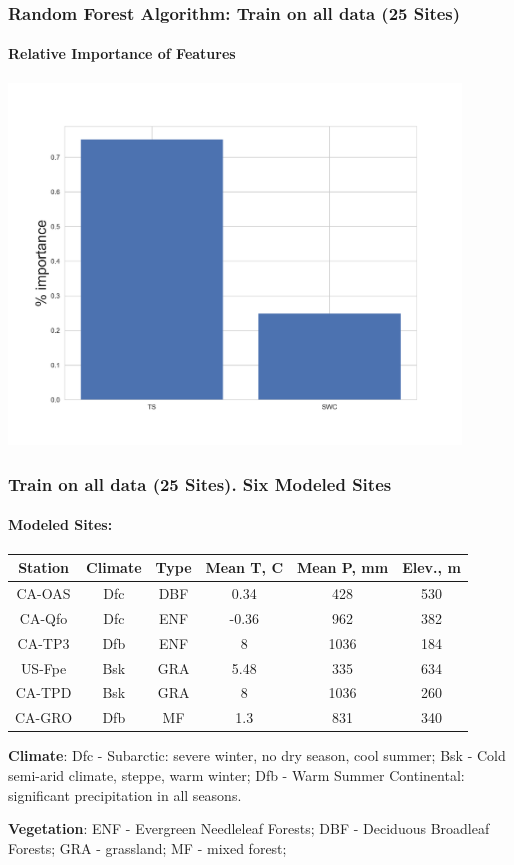\documentclass{beamer}
\begin{document}
\begin{frame}
\frametitle{Random Forest Algorithm: Train on all data (25 Sites)}
\framesubtitle{Relative Importance of Features}
\centering
\includegraphics[width=0.9\textwidth]{importance_3.png}\\
\end{frame}

\begin{frame}
\frametitle{Train on all data (25 Sites). Six Modeled Sites}
\framesubtitle{Modeled Sites:}
\begin{center}
\begin{tabular}{| c | c | c | c | c | c |}
\hline
Station   & Climate & Type & Mean T, C & Mean P, mm & Elev., m\\ \hline
CA-OAS & Dfc     & DBF  & 0.34      & 428        & 530 \\\hline
CA-Qfo & Dfc     & ENF  & -0.36     & 962        & 382 \\\hline
CA-TP3 & Dfb     & ENF  & 8         & 1036       & 184 \\\hline
US-Fpe & Bsk     & GRA  & 5.48      & 335        & 634 \\\hline
CA-TPD & Bsk     & GRA  & 8         & 1036       & 260 \\\hline
CA-GRO & Dfb     & MF   & 1.3         & 831       & 340 \\\hline

\hline
\end{tabular}
\end{center}
\textbf{Climate}:
Dfc - Subarctic: severe winter, no dry season, cool summer;
Bsk - Cold semi-arid climate, steppe, warm winter;
Dfb - Warm Summer Continental: significant precipitation in all seasons.

\textbf{Vegetation}:
ENF - Evergreen Needleleaf Forests;
DBF - Deciduous Broadleaf Forests;
GRA - grassland;
MF - mixed forest;

\end{frame}
\end{document}
